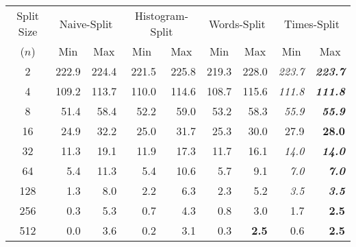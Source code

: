 \begin{tabular} {| c || r | r || r | r || r | r || r | r |}
\hline
Split Size & \multicolumn{2}{|c||}{\sc Naive-Split} & \multicolumn{2}{|c||}{\sc Histogram-Split} & \multicolumn{2}{|c||}{\sc Words-Split} & \multicolumn{2}{|c|}{\sc Times-Split} \\ \cline{2-9}
($n$) & \multicolumn{1}{|c|}{Min} & \multicolumn{1}{|c||}{Max} & \multicolumn{1}{|c|}{Min} & \multicolumn{1}{|c||}{Max} & \multicolumn{1}{|c|}{Min} & \multicolumn{1}{|c||}{Max} & \multicolumn{1}{|c|}{Min} & \multicolumn{1}{|c|}{Max} \\ \hline
2 & {222.9} & {224.4 } & {221.5} & {225.8 } & {219.3} & {228.0 } & \textit{223.7} & \textbf{\textit{223.7 }} \\ \hline
4 & {109.2} & {113.7 } & {110.0} & {114.6 } & {108.7} & {115.6 } & \textit{111.8} & \textbf{\textit{111.8 }} \\ \hline
8 & {51.4} & {58.4 } & {52.2} & {59.0 } & {53.2} & {58.3 } & \textit{55.9} & \textbf{\textit{55.9 }} \\ \hline
16 & {24.9} & {32.2 } & {25.0} & {31.7 } & {25.3} & {30.0 } & {27.9} & \textbf{28.0 } \\ \hline
32 & {11.3} & {19.1 } & {11.9} & {17.3 } & {11.7} & {16.1 } & \textit{14.0} & \textbf{\textit{14.0 }} \\ \hline
64 & {5.4} & {11.3 } & {5.4} & {10.6 } & {5.7} & {9.1 } & \textit{7.0} & \textbf{\textit{7.0 }} \\ \hline
128 & {1.3} & {8.0 } & {2.2} & {6.3 } & {2.3} & {5.2 } & \textit{3.5} & \textbf{\textit{3.5 }} \\ \hline
256 & {0.3} & {5.3 } & {0.7} & {4.3 } & {0.8} & {3.0 } & {1.7} & \textbf{2.5 } \\ \hline
512 & {0.0} & {3.6 } & {0.2} & {3.1 } & {0.3} & \textbf{2.5 } & {0.6} & \textbf{2.5 } \\ \hline
\end{tabular}
